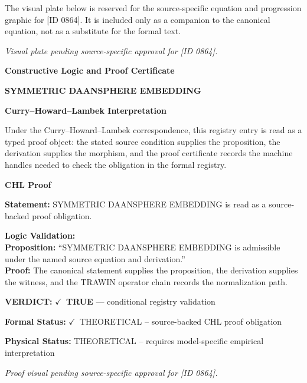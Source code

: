 \begingroup\footnotesize\sloppy
The visual plate below is reserved for the source-specific equation and progression graphic for [ID 0864]. It is included only as a companion to the canonical equation, not as a substitute for the formal text.
\par\endgroup
\begingroup\footnotesize\itshape
Visual plate pending source-specific approval for [ID 0864].
\par\endgroup

\clearpage
\begingroup\tzpsupportsetup
\noindent\textbf{\fontsize{10.8pt}{12.8pt}\selectfont [ID 0864] Constructive Logic and Proof Certificate}\par
\noindent\textbf{\fontsize{10pt}{12pt}\selectfont SYMMETRIC DAANSPHERE EMBEDDING}\par
\vspace{0.45em}
\begingroup
\footnotesize
\setlength{\parskip}{0.22em}
\setlength{\parindent}{0pt}
\noindent\textbf{Curry--Howard--Lambek Interpretation}\par
Under the Curry--Howard--Lambek correspondence, this registry entry is read as a typed proof
object: the stated source condition supplies the proposition, the derivation supplies the
morphism, and the proof certificate records the machine handles needed to check the obligation
in the formal registry.

\vspace{0.45em}
\noindent\textbf{CHL Proof}\par
\textbf{Statement:} SYMMETRIC DAANSPHERE EMBEDDING is read as a source-backed proof obligation.

\textbf{Logic Validation:}\\
\textbf{Proposition:} ``SYMMETRIC DAANSPHERE EMBEDDING is admissible under the named source equation and derivation.''\\
\textbf{Proof:} The canonical statement supplies the proposition, the derivation supplies the witness, and the TRAWIN operator chain records the normalization path.

\textbf{VERDICT:} \ensuremath{\checkmark}\ \textbf{TRUE} --- conditional registry validation

\textbf{Formal Status:} \ensuremath{\checkmark}\ THEORETICAL -- source-backed CHL proof obligation

\textbf{Physical Status:} THEORETICAL -- requires model-specific empirical interpretation
\par\vspace{0.45em}
\par
\vfill
\begingroup\footnotesize\itshape
Proof visual pending source-specific approval for [ID 0864].
\par\endgroup
\vfill
\endgroup
\endgroup
